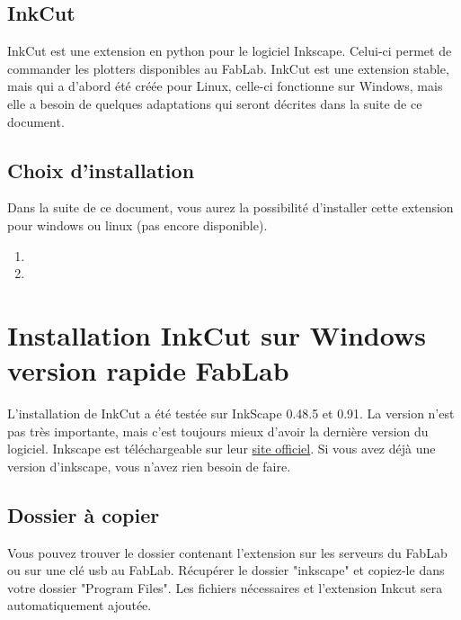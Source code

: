 \documentclass[a4paper,oneside,12pt]{report}
\begin{document}
\section{InkCut}\label{InkCut}
InkCut est une extension en python pour le logiciel Inkscape. Celui-ci permet de commander les plotters disponibles au FabLab.
InkCut est une extension stable, mais qui a d'abord été créée pour Linux, celle-ci fonctionne sur Windows, mais elle a besoin de quelques adaptations
qui seront décrites dans la suite de ce document.

\section{Choix d'installation}
Dans la suite de ce document, vous aurez la possibilité d'installer cette extension pour windows ou linux (pas encore disponible).

\begin{enumerate}

\item {}
\item {}

\end{enumerate}



\chapter{Installation InkCut sur Windows version rapide FabLab}\label{windowsRapide}

L'installation de InkCut a été testée sur InkScape 0.48.5 et 0.91. La version n'est pas très importante, mais c'est toujours mieux d'avoir la dernière version
du logiciel. Inkscape est téléchargeable sur leur \href{https://inkscape.org/fr/telechargement/}{site officiel}.
Si vous avez déjà une version d'inkscape, vous n'avez rien besoin de faire.

\section{Dossier à copier}
Vous pouvez trouver le dossier contenant l'extension sur les serveurs du FabLab ou sur une clé usb au FabLab. Récupérer le dossier "inkscape" et copiez-le dans votre dossier "Program Files". Les fichiers nécessaires et l'extension Inkcut sera automatiquement ajoutée.\newline
\end{document}
